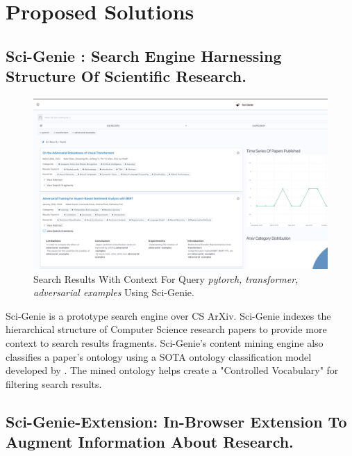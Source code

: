 \chapter{Proposed Solutions}
\label{method}

\section{Sci-Genie : Search Engine Harnessing Structure Of Scientific Research. }
\begin{figure}[h]
    \centering
    \includegraphics[width=\maxwidth{\textwidth}]{src/images/genie-search-exp.pdf}
    \caption{Search Results With Context For Query \textit{pytorch, transformer, adversarial examples} Using Sci-Genie. }
    \label{figure\arabic{figurecounter}}
\end{figure}

Sci-Genie is a prototype search engine over CS ArXiv. Sci-Genie indexes the hierarchical structure of Computer Science research papers to provide more context to search results fragments. Sci-Genie's content mining engine also classifies a paper's ontology using a SOTA ontology classification model developed by \cite{salatino2020ontology}. The mined ontology helps create a "Controlled Vocabulary" for filtering search results. 

\section{Sci-Genie-Extension: In-Browser Extension To Augment Information About Research. }

